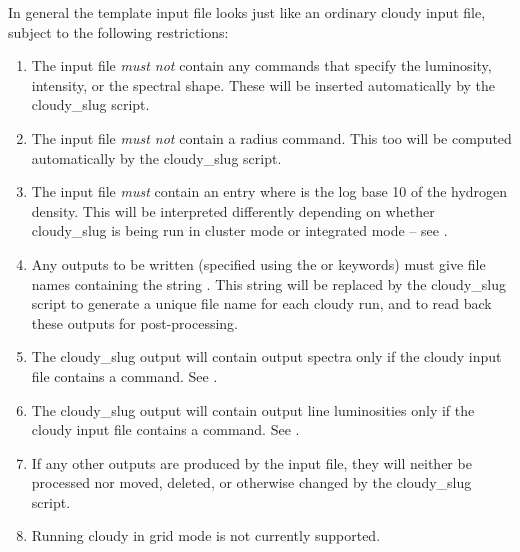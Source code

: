 \documentclass[letterpaper,10pt,english]{sphinxmanual}
\begin{document}
In general the template input file looks just like an ordinary cloudy
input file, subject to the following restrictions:
\begin{enumerate}
\item {} 
The input file \emph{must not} contain any commands that specify the
luminosity, intensity, or the spectral shape. These will be
inserted automatically by the cloudy\_slug script.

\item {} 
The input file \emph{must not} contain a radius command. This too will
be computed automatically by the cloudy\_slug script.

\item {} 
The input file \emph{must} contain an entry  where  is
the log base 10 of the hydrogen density. This will be interpreted
differently depending on whether cloudy\_slug is being run in
cluster mode or integrated mode -- see {\hyperref[cloudy:ssec-cloudy-cluster]{\emph{}}}.

\item {} 
Any outputs to be written (specified using the  or
 keywords) must give file names containing the string
. This string will be replaced by the
cloudy\_slug script to generate a unique file name for each cloudy
run, and to read back these outputs for post-processing.

\item {} 
The cloudy\_slug output will contain output spectra only if the
cloudy input file contains a  command. See
{\hyperref[cloudy:ssec-cloudy-output]{\emph{}}}.

\item {} 
The cloudy\_slug output will contain output line luminosities only
if the cloudy input file contains a  command. See {\hyperref[cloudy:ssec-cloudy-output]{\emph{}}}.

\item {} 
If any other outputs are produced by the input file, they will
neither be processed nor moved, deleted, or otherwise changed by
the cloudy\_slug script.

\item {} 
Running cloudy in grid mode is not currently supported.

\end{enumerate}
\end{document}
